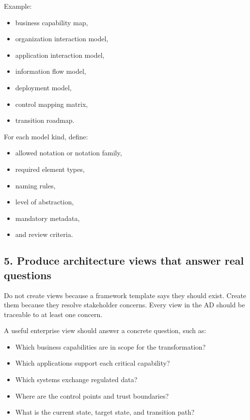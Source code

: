 \documentclass[11pt]{article}
\begin{document}
Example:
\begin{itemize}
    \item business capability map,
    \item organization interaction model,
    \item application interaction model,
    \item information flow model,
    \item deployment model,
    \item control mapping matrix,
    \item transition roadmap.
\end{itemize}

For each model kind, define:
\begin{itemize}
    \item allowed notation or notation family,
    \item required element types,
    \item naming rules,
    \item level of abstraction,
    \item mandatory metadata,
    \item and review criteria.
\end{itemize}

\subsection*{5. Produce architecture views that answer real questions}
Do not create views because a framework template says they should exist. Create them because they resolve stakeholder concerns. Every view in the AD should be traceable to at least one concern.

A useful enterprise view should answer a concrete question, such as:
\begin{itemize}
    \item Which business capabilities are in scope for the transformation?
    \item Which applications support each critical capability?
    \item Which systems exchange regulated data?
    \item Where are the control points and trust boundaries?
    \item What is the current state, target state, and transition path?
\end{itemize}
\end{document}
